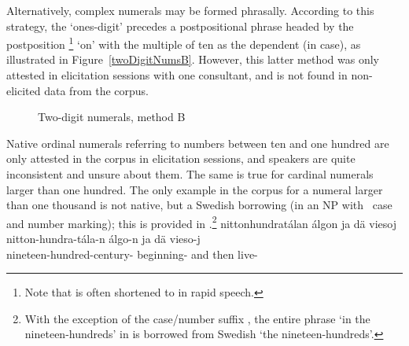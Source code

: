 Alternatively, complex numerals may be formed phrasally. According to this strategy, the ‘ones-digit’ precedes a postpositional phrase headed by the postposition \footnote{Note that  is often shortened to  in rapid speech.} 
‘on’ with the multiple of ten as the dependent  (in  case), as illustrated in Figure~\vref{twoDigitNumsB}. %
However, this latter method was only attested in elicitation sessions with one consultant, and is not found in non-elicited data from the corpus.
\begin{figure}[ht]\centering
{}
\caption{Two-digit numerals, method B}\label{twoDigitNumsB}
\end{figure}

Native ordinal numerals referring to numbers between ten and one hundred are only attested in the corpus in elicitation sessions, and speakers are quite inconsistent and unsure about them. 
The same is true for cardinal numerals larger than one hundred. %
The only example in the corpus for a numeral larger than one thousand is not native, but a Swedish borrowing (in an NP with \PS\ case and number marking); this is provided in .\footnote{With the exception of the case/number suffix , the entire phrase  ‘in the nineteen-hundreds’ in  is borrowed from Swedish  ‘the nineteen-hundreds’.}
\ea\label{complexNumEx4}
\glll	nittonhundratálan álgon ja dä viesoj\\
	nitton-hundra-tála-n álgo-n ja dä vieso-j\\
	nineteen-hundred-century- beginning- and then live-\\
	
\z


